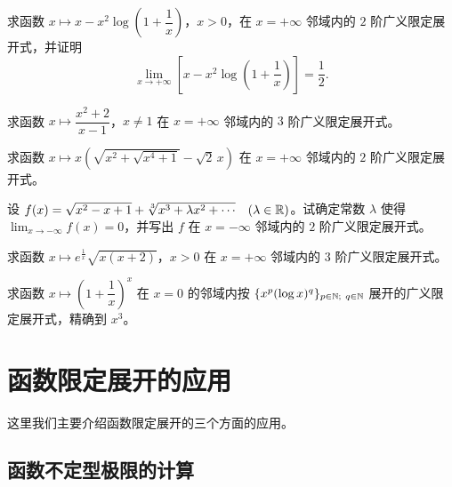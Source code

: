 \begin{exercise}
	\item 求函数 $x\longmapsto x-x^{2}\log\left(1+\dfrac{1}{x}\right)$，$x>0$，在 $x=+\infty$ 邻域内的 $2$ 阶广义限定展开式，并证明
	\[\lim_{x\to+\infty}\left[x-x^{2}\log\left(1+\frac{1}{x}\right)\right]=\frac{1}{2}.\]
\end{exercise}

\begin{exercise}
	\item 求函数 $x\longmapsto\dfrac{x^{2}+2}{x-1}$，$x\neq1$ 在 $x=+\infty$ 邻域内的 $3$ 阶广义限定展开式。
\end{exercise}

\begin{exercise}
	\item 求函数 $x\longmapsto x\left(\sqrt{x^{2}+\sqrt{x^{4}+1}}-\sqrt{2}\,x\right)$ 在 $x=+\infty$ 邻域内的 $2$ 阶广义限定展开式。
\end{exercise}

\begin{exercise}
	\item 设 $f(x)=\sqrt{x^{2}-x+1}+\sqrt[3]{x^{3}+\lambda x^{2}+\cdots}\quad(\lambda\in\mathbb{R})$。试确定常数 $\lambda$ 使得 $\displaystyle\lim_{x\to-\infty}f(x)=0$，并写出 $f$ 在 $x=-\infty$ 邻域内的 $2$ 阶广义限定展开式。
\end{exercise}

\begin{exercise}
	\item 求函数 $x\longmapsto e^{\frac{1}{x}}\sqrt{x(x+2)}$，$x>0$ 在 $x=+\infty$ 邻域内的 $3$ 阶广义限定展开式。
\end{exercise}

\begin{exercise}
	\item 求函数 $x\longmapsto\left(1+\dfrac{1}{x}\right)^{x}$ 在 $x=0$ 的邻域内按 $\{x^p(\log x)^q\}_{p\in\N;\ q\in\N}$ 展开的广义限定展开式，精确到 $x^3$。
\end{exercise}

\section{函数限定展开的应用}

这里我们主要介绍函数限定展开的三个方面的应用。

\subsection{函数不定型极限的计算}

